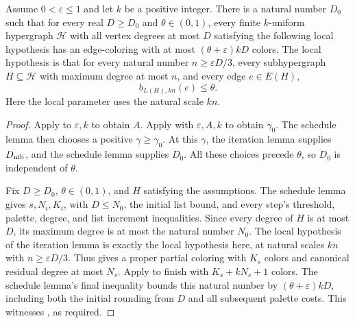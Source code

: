 \begin{lemma}
Assume $0<\varepsilon\le1$ and let $k$ be a positive integer. There is a
natural number $D_0$ such that for every real $D\ge D_0$ and
$\theta\in(0,1)$, every finite $k$-uniform hypergraph $\mathcal H$ with
all vertex degrees at most $D$ satisfying the following local hypothesis
has an edge-coloring with at most $(\theta+\varepsilon)kD$ colors.
The local hypothesis is that for every natural number
$n\ge\varepsilon D/3$, every subhypergraph $H\subseteq\mathcal H$ with
maximum degree at most $n$, and every edge $e\in E(H)$,
\[
b_{L(H),kn}(e)\le\theta.
\]
Here the local parameter uses the natural scale $kn$.
\end{lemma}
\begin{proof}
Apply  to $\varepsilon,k$ to
obtain $A$. Apply 
with $\varepsilon,A,k$ to obtain $\gamma_0$. The schedule lemma then
chooses a positive $\gamma\ge\gamma_0$. At this $\gamma$, the iteration
lemma supplies $D_{\rm nib}$, and the schedule lemma supplies $D_0$.
All these choices precede $\theta$, so $D_0$ is independent of $\theta$.

Fix $D\ge D_0$, $\theta\in(0,1)$, and $H$ satisfying the assumptions.
The schedule lemma gives $s,N_i,K_i$, with $D\le N_0$, the initial
list bound, and every step's threshold, palette, degree, and list
increment inequalities. Since every degree of $H$ is at most $D$,
its maximum degree is at most the natural number $N_0$.
The local hypothesis of the iteration lemma is exactly the local
hypothesis here, at natural scales $kn$ with $n\ge\varepsilon D/3$.
Thus  gives a proper
partial coloring with $K_s$ colors and canonical residual degree at
most $N_s$. Apply  to finish
with $K_s+kN_s+1$ colors. The schedule lemma's final inequality bounds
this natural number by $(\theta+\varepsilon)kD$, including both the
initial rounding from $D$ and all subsequent palette costs.
This witnesses , as required.
\end{proof}
